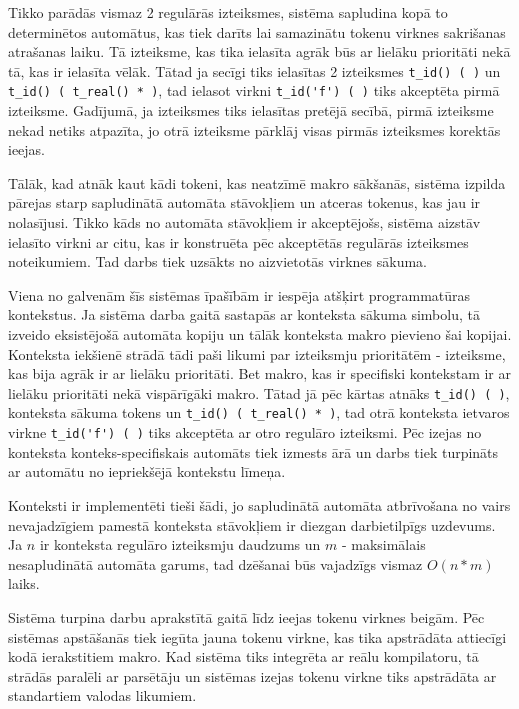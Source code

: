 Tikko parādās vismaz 2 regulārās izteiksmes, sistēma sapludina kopā to determinētos automātus, kas tiek darīts lai samazinātu tokenu virknes sakrišanas atrašanas laiku. Tā izteiksme, kas tika ielasīta agrāk būs ar lielāku prioritāti nekā tā, kas ir ielasīta vēlāk. Tātad ja secīgi tiks ielasītas 2 izteiksmes \verb|t_id() ( )| un \verb|t_id() ( t_real() * )|, tad ielasot virkni \verb|t_id('f') ( )| tiks akceptēta pirmā izteiksme. Gadījumā, ja izteiksmes tiks ielasītas pretējā secībā, pirmā izteiksme nekad netiks atpazīta, jo otrā izteiksme pārklāj visas pirmās izteiksmes korektās ieejas.

Tālāk, kad atnāk kaut kādi tokeni, kas neatzīmē makro sākšanās, sistēma izpilda pārejas starp sapludinātā automāta stāvokļiem un atceras tokenus, kas jau ir nolasījusi. Tikko kāds no automāta stāvokļiem ir akceptējošs, sistēma aizstāv ielasīto virkni ar citu, kas ir konstruēta pēc akceptētās regulārās izteiksmes noteikumiem. Tad darbs tiek uzsākts no aizvietotās virknes sākuma. 

Viena no galvenām šīs sistēmas īpašībām ir iespēja atšķirt programmatūras kontekstus. Ja sistēma darba gaitā sastapās ar konteksta sākuma simbolu, tā izveido eksistējošā automāta kopiju un tālāk konteksta makro pievieno šai kopijai. Konteksta iekšienē strādā tādi paši likumi par izteiksmju prioritātēm - izteiksme, kas bija agrāk ir ar lielāku prioritāti. Bet makro, kas ir specifiski kontekstam ir ar lielāku prioritāti nekā vispārīgāki makro. Tātad jā pēc kārtas atnāks \verb|t_id() ( )|, konteksta sākuma tokens un \verb|t_id() ( t_real() * )|, tad otrā konteksta ietvaros virkne \verb|t_id('f') ( )| tiks akceptēta ar otro regulāro izteiksmi. Pēc izejas no konteksta konteks-specifiskais automāts tiek izmests ārā un darbs tiek turpināts ar automātu no iepriekšējā kontekstu līmeņa.

Konteksti ir implementēti tieši šādi, jo sapludinātā automāta atbrīvošana no vairs nevajadzīgiem pamestā konteksta stāvokļiem ir diezgan darbietilpīgs uzdevums. Ja $n$ ir konteksta regulāro izteiksmju daudzums un $m$ - maksimālais nesapludinātā automāta garums, tad dzēšanai būs vajadzīgs vismaz $O(n*m)$ laiks. 

Sistēma turpina darbu aprakstītā gaitā līdz ieejas tokenu virknes beigām. Pēc sistēmas apstāšanās tiek iegūta jauna tokenu virkne, kas tika apstrādāta attiecīgi kodā ierakstitiem makro. Kad sistēma tiks integrēta ar reālu kompilatoru, tā strādās paralēli ar parsētāju un sistēmas izejas tokenu virkne tiks apstrādāta ar standartiem valodas likumiem.

